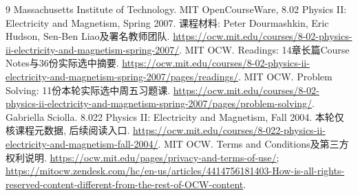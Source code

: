 \begin{thebibliography}{9}
 Massachusetts Institute of Technology. MIT OpenCourseWare, 8.02 Physics II: Electricity and Magnetism, Spring 2007. 课程材料: Peter Dourmashkin, Eric Hudson, Sen-Ben Liao及署名教师团队. \url{https://ocw.mit.edu/courses/8-02-physics-ii-electricity-and-magnetism-spring-2007/}.
 MIT OCW. Readings: 14章长篇Course Notes与36份实际选中摘要. \url{https://ocw.mit.edu/courses/8-02-physics-ii-electricity-and-magnetism-spring-2007/pages/readings/}.
 MIT OCW. Problem Solving: 11份本轮实际选中周五习题课. \url{https://ocw.mit.edu/courses/8-02-physics-ii-electricity-and-magnetism-spring-2007/pages/problem-solving/}.
 Gabriella Sciolla. 8.022 Physics II: Electricity and Magnetism, Fall 2004. 本轮仅核课程元数据, 后续阅读入口. \url{https://ocw.mit.edu/courses/8-022-physics-ii-electricity-and-magnetism-fall-2004/}.
 MIT OCW. Terms and Conditions及第三方权利说明. \url{https://ocw.mit.edu/pages/privacy-and-terms-of-use/}; \url{https://mitocw.zendesk.com/hc/en-us/articles/4414756181403-How-is-all-rights-reserved-content-different-from-the-rest-of-OCW-content}.
\end{thebibliography}
